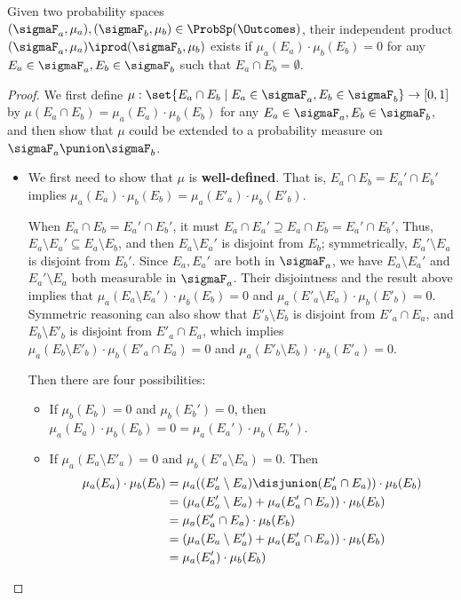 \documentclass[acmsmall,nonacm,screen,appendix]{acmart}
\begin{document}
 \begin{lemma}
  \label{lemma:indep-prod-exists}
  Given two probability spaces
  $(\sigmaF_a, \mu_a), (\sigmaF_b, \mu_b) \in \ProbSp(\Outcomes)$,
  their independent product
  $(\sigmaF_a, \mu_a) \iprod (\sigmaF_b, \mu_b)$ exists
  if $\mu_a(E_a) \cdot \mu_b(E_b) = 0 $
  for any $E_a \in \sigmaF_a, E_b \in \sigmaF_b$ such that
  $E_a \cap E_b = \emptyset$.
 \end{lemma}

 \begin{proof}
We first define $\mu: \set{E_a \cap E_b \mid E_a \in \sigmaF_a, E_b \in \sigmaF_b}
  \to [0,1]$ by $\mu(E_a \cap E_b) = \mu_a(E_a) \cdot \mu_b(E_b)$
   for any $E_a \in \sigmaF_a, E_b \in \sigmaF_b$,
   and then show that $\mu$ could be extended to a probability
   measure on $\sigmaF_a \punion \sigmaF_b$.

  \begin{itemize}
   \item We first need to show that $\mu$ is \textbf{well-defined}.
    That is,
    $E_a \cap E_b = E_a' \cap E_b'$
    implies $\mu_a(E_a) \cdot \mu_b(E_b) = \mu_a(E'_a) \cdot \mu_b(E'_b)$.

     When $E_a \cap E_b = E_a' \cap E_b'$, it must $E_a \cap E_a' \supseteq
     E_a \cap E_b = E_a' \cap E_b'$, Thus, $E_a \setminus E_a' \subseteq E_a
     \setminus E_b$, and then $E_a \setminus E_a'$ is disjoint from $E_b$;
     symmetrically, $E_a' \setminus E_a$ is disjoint from $E_b'$.
     Since $E_a, E_a'$ are both in $\sigmaF_{a}$, we have $E_a \setminus E_a'$
     and $E_a' \setminus E_a$ both measurable in $\sigmaF_a$.
     Their disjointness and the result above implies that
     $\mu_a(E_a \setminus E_a') \cdot \mu_b(E_b) = 0$ and
     $\mu_a(E'_a \setminus E_a) \cdot \mu_b(E'_b) = 0$.
     Symmetric reasoning can also show that
     $E'_b \setminus E_b$ is disjoint from $E'_a \cap E_a$,
       and  $E_b \setminus E'_b$ is disjoint from $E'_a \cap E_a$,
       which implies
       $\mu_a(E_b \setminus E'_b) \cdot \mu_b(E'_a \cap E_a) = 0$ and
     $\mu_a(E'_b \setminus E_b) \cdot \mu_b(E'_a) = 0$.

     Then there are four possibilities:
     \begin{itemize}
      \item If $\mu_b(E_b) = 0$ and $\mu_b(E_b') = 0$,
       then $\mu_a(E_a) \cdot \mu_b(E_b) = 0 = \mu_a(E_a') \cdot \mu_b(E_b')$.
      \item If $\mu_a(E_a \setminus E'_a) = 0$ and $\mu_b(E'_a \setminus E_a) = 0$.
       Then
       \begin{align*}
        \mu_a(E_a) \cdot \mu_b(E_b) &=
        \mu_a((E'_a \setminus E_a) \disjunion (E'_a \cap E_a)) \cdot \mu_b(E_b) \\
          &= (\mu_a(E'_a \setminus E_a) + \mu_a(E'_a \cap E_a)) \cdot \mu_b(E_b) \\
          &= \mu_a(E'_a \cap E_a) \cdot \mu_b(E_b) \\
          &= (\mu_a(E_a \setminus E'_a) + \mu_a(E'_a \cap E_a)) \cdot \mu_b(E_b) \\
          &= \mu_a(E'_a) \cdot \mu_b(E_b)
       \end{align*}


\end{itemize}
\end{itemize}
\end{proof}
\end{document}

